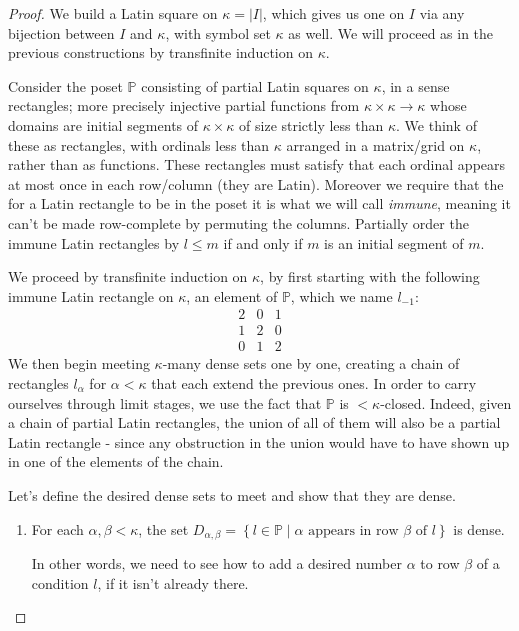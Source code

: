 \documentclass[12pt,a4paper]{article}
\newcommand{\To}{\longrightarrow}
\newcommand{\st}{\; | \;}
\newcommand{\set}[2]{\left\{#1\st #2 \right\}}
\renewcommand{\P}{\mathbb{P}}
\begin{document}
\begin{proof}
We build a Latin square on $\kappa=|I|$, which gives us one on $I$ via any bijection between $I$ and $\kappa$, with symbol set $\kappa$ as well. We will proceed as in the previous constructions by transfinite induction on $\kappa$. 

Consider the poset $\P$ consisting of partial Latin squares on $\kappa$, in a sense rectangles; more precisely injective partial functions from $\kappa\times\kappa\To\kappa$ whose domains are initial segments of $\kappa\times\kappa$ of size strictly less than $\kappa$. We think of these as rectangles, with ordinals less than $\kappa$ arranged in a matrix/grid on $\kappa$, rather than as functions. These rectangles must satisfy that each ordinal appears at most once in each row/column (they are Latin). Moreover we require that the for a Latin rectangle to be in the poset it is what we will call \textit{immune}, meaning it can't be made row-complete by permuting the columns. Partially order the immune Latin rectangles by $l\leq m$ if and only if $m$ is an initial segment of $m$.

We proceed by transfinite induction on $\kappa$, by first starting with the following immune Latin rectangle on $\kappa$, an element of $\P$, which we name $l_{-1}$:
$$
\begin{array}{ccc}
2  & 0 & 1 \\ 
1 & 2 &  0  \\
 0  & 1 & 2 
\end{array}
$$
We then begin meeting $\kappa$-many dense sets one by one, creating a chain of rectangles $l_\alpha$ for $\alpha<\kappa$ that each extend the previous ones. In order to carry ourselves through limit stages, we use the fact that $\P$ is $<\kappa$-closed. Indeed, given a chain of partial Latin rectangles, the union of all of them will also be a partial Latin rectangle - since any obstruction in the union would have to have shown up in one of the elements of the chain.

Let's define the desired dense sets to meet and show that they are dense.
\begin{enumerate}
	\item For each $\alpha, \beta<\kappa$, the set $D_{\alpha,\beta}=\set{l \in \P}{\alpha \text{ appears in row } \beta \text{ of } l}$ is dense.
	
	In other words, we need to see how to add a desired number $\alpha$ to row $\beta$ of a condition $l$, if it isn't already there. 


\end{enumerate}
\end{proof}
\end{document}

